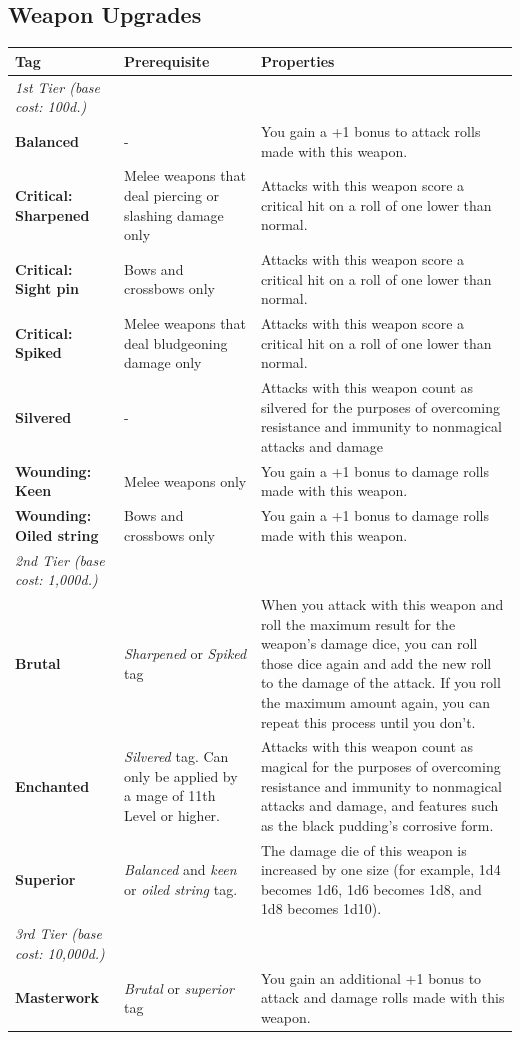 \documentclass{book}
\begin{document}
\subsection*{Weapon Upgrades}\label{weapon-upgrades}

\begin{tabular}{p{1.9in} p{1.3in} p{2.7in} }
	\toprule
		Tag & Prerequisite & Properties \\
	\midrule
		\emph{1st Tier (base cost: 100d.)} & &  \\
		\textbf{Balanced} & - & You gain a +1 bonus to attack rolls made with
		this weapon. \\
		\textbf{Critical: Sharpened} & Melee weapons that deal piercing or
		slashing damage only & Attacks with this weapon score a critical hit on
		a roll of one lower than normal. \\
		\textbf{Critical: Sight pin} & Bows and crossbows only & Attacks with
		this weapon score a critical hit on a roll of one lower than normal. \\
		\textbf{Critical: Spiked} & Melee weapons that deal bludgeoning damage
		only & Attacks with this weapon score a critical hit on a roll of one
		lower than normal. \\
		\textbf{Silvered} & - & Attacks with this weapon count as silvered for
		the purposes of overcoming resistance and immunity to nonmagical attacks
		and damage \\
		\textbf{Wounding: Keen} & Melee weapons only & You gain a +1 bonus to
		damage rolls made with this weapon. \\
		\textbf{Wounding: Oiled string} & Bows and crossbows only & You gain a
		+1 bonus to damage rolls made with this weapon. \\
		\emph{2nd Tier (base cost: 1,000d.)} & & \\
		\textbf{Brutal} & \emph{Sharpened} or \emph{Spiked} tag & When you
		attack with this weapon and roll the maximum result for the weapon's
		damage dice, you can roll those dice again and add the new roll to the
		damage of the attack. If you roll the maximum amount again, you can
		repeat this process until you don't. \\
		\textbf{Enchanted} & \emph{Silvered} tag. Can only be applied by a mage
		of 11th Level or higher. & Attacks with this weapon count as magical for
		the purposes of overcoming resistance and immunity to nonmagical attacks
		and damage, and features such as the black pudding's corrosive form. \\
		\textbf{Superior} & \emph{Balanced} and \emph{keen} or \emph{oiled
		string} tag. & The damage die of this weapon is increased by one size
		(for example, 1d4 becomes 1d6, 1d6 becomes 1d8, and 1d8 becomes
		1d10). \\
		\emph{3rd Tier (base cost: 10,000d.)} & & \\
		\textbf{Masterwork} & \emph{Brutal} or \emph{superior} tag & You gain an
		additional +1 bonus to attack and damage rolls made with this weapon. \\
	\bottomrule
\end{tabular}
\end{document}
